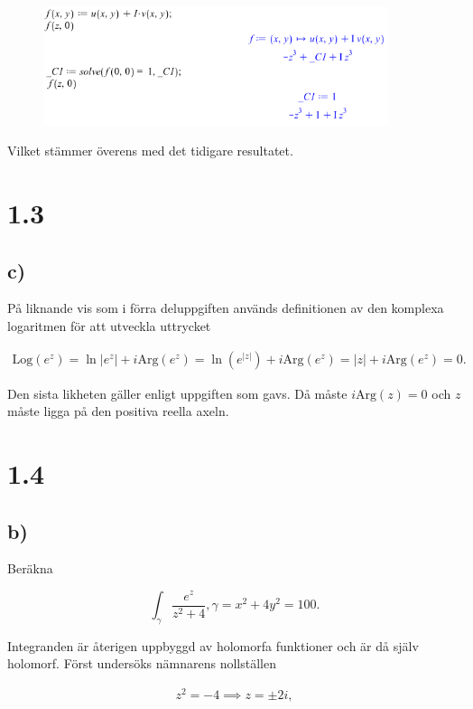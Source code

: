\documentclass[a4paper]{article}
\begin{document}
\begin{figure}[h!]
	\centering
	\includegraphics[width=0.9\textwidth]{maple_11_4.png}
\end{figure}

Vilket stämmer överens med det tidigare resultatet.

\section*{1.3}
\subsection*{c)}

På liknande vis som i förra deluppgiften används definitionen av den komplexa logaritmen för att utveckla uttrycket

\begin{align*}
	\text{Log}(e^z) = \ln|e^z| + i\text{Arg}(e^z)  = \ln(e^{|z|}) + i\text{Arg}(e^z) = |z| + i\text{Arg}(e^z) = 0.
\end{align*}

Den sista likheten gäller enligt uppgiften som gavs. Då måste $i\text{Arg}(z) = 0$ och $z$ måste ligga på den positiva reella axeln.

\section*{1.4}
\subsection*{b)}

Beräkna

\begin{equation*}
	\int_\gamma \frac{e^z}{z^2 + 4}, \gamma = x^2 + 4y^2 = 100.
\end{equation*}

Integranden är återigen uppbyggd av holomorfa funktioner och är då själv holomorf. Först undersöks nämnarens nollställen

\begin{align*}
	z^2 = -4 \implies z = \pm 2i,
\end{align*}
\end{document}
